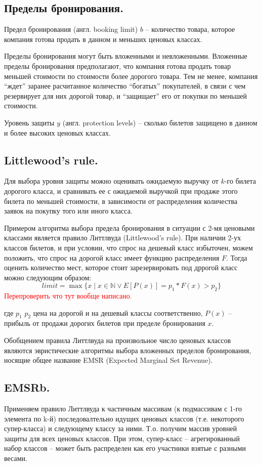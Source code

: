 \documentclass[reqno]{article}
\theoremstyle{definition}
\theoremstyle{definition}
\theoremstyle{definition}
\theoremstyle{definition}
\theoremstyle{definition}
\theoremstyle{definition}
\theoremstyle{definition}
\theoremstyle{definition}
\theoremstyle{definition}
\begin{document}
		
		\subsection{Пределы бронирования.}
				
		Предел бронирования (англ. booking limit) $b$ -- количество товара, которое компания готова продать в данном и меньших ценовых классах.
	
		Пределы бронирования могут быть вложенными и невложенными. Вложенные пределы бронирования предполагают, что компания готова продать товар меньшей стоимости по стоимости более дорогого товара. Тем не менее, компания ``ждет'' заранее расчитанное количество ``богатых'' покупателей, в связи с чем резервирует для них дорогой товар, и ``защищает'' его от покупки по меньшей стоимости.
		
		Уровень защиты $y$ (англ. protection levels) -- сколько билетов защищено в данном и более высоких ценовых классах.
		
		\subsection{Littlewood's rule.}
		
		Для выбора уровня защиты можно оценивать ожидаемую выручку от $k$-го билета дорогого класса, и сравнивать ее с ожидаемой выручкой при продаже этого билета по меньшей стоимости, в зависимости от распределения количества заявок на покупку того или иного класса.
		
		Примером алгоритма выбора предела бронирования в ситуации с 2-мя ценовыми классами является правило Литтлвуда (Littlewood's rule). При наличии 2-ух классов билетов, и при условии, что спрос на дешевый класс избыточен, можем положить, что спрос на дорогой класс имеет функцию распределения ${F}$. Тогда оценить количество мест, которое стоит зарезервировать под дррогой класс можно следующим образом:
		$$limit = \max \{x \mid x \in \mathds{N} \vee E[P(x)] = p_1 * F(x) > p_2\}$$
		\textcolor{red}{Перепроверить что тут вообще написано.}
		
		где $p_1$ $p_2$ цена на дорогой и на дешевый классы соответственно, $P(x)$ -- прибыль от продажи дорогих билетов при пределе бронирования $x$.
		
		Обобщением правила Литтлвуда на произвольное число ценовых классов являются эвристические алгоритмы выбора вложенных пределов бронирования, носящие общее название EMSR (Expected Marginal Set Revenue).
		
		
		\subsection{EMSRb.}		
		Применяем правило Литтлвуда к частичным массивам (к подмассивам с 1-го элемента по k-й) последовалтельно идущих ценовых классов (т.е. некоторого супер-класса) и следующему классу за ними. Т.о. получим массив уровней защиты для всех ценовых классов. При этом, супер-класс -- агрегированный набор классов -- может быть распределен как его участники взятые с разными весами.	
		
\end{document}
